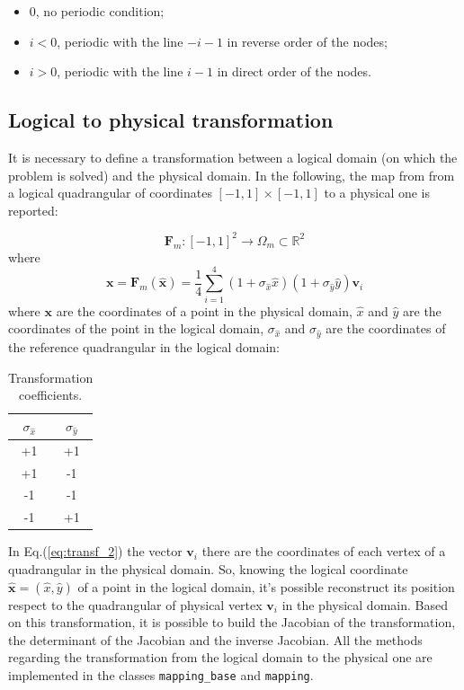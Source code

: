 \begin{itemize}
\item 0, no periodic condition;
\item $i<0$, periodic with the line $-i-1$ in reverse order of the nodes;
\item $i>0$, periodic with the line $i-1$ in direct order of the nodes.
\end{itemize}

\subsection{Logical to physical transformation}\label{subsec:mapping}
It is necessary to define a transformation between a logical domain (on which the problem is solved) and the physical domain. In the following, the map from from a logical quadrangular of coordinates $[-1,1]\times[-1,1]$ to a physical one is reported:

\begin{equation}\label{eq:transf_1}
\textbf{F}_m:[-1,1]^2 \rightarrow \Omega_m \subset \mathbb{R}^2
\end{equation}
where
\begin{equation}\label{eq:transf_2}
\textbf{x}=\textbf{F}_m(\hat{\textbf{x}})= \frac{1}{4} \sum_{i=1}^{4} (1+\sigma_{\hat{x}}\hat{x})(1+\sigma_{\hat{y}}\hat{y}) \textbf{v}_i
\end{equation}
where $\textbf{x}$ are the coordinates of a point in the physical domain, $\hat{x}$ and $\hat{y}$ are the coordinates of the point in the logical domain, $\sigma_{\hat{x}}$ and $\sigma_{\hat{y}}$ are the coordinates of the reference quadrangular in the logical domain:

\begin{table}
\centering
\begin{tabular}{|c|c|}
\hline
$\sigma_{\hat{x}}$ & $\sigma_{\hat{y}}$\\
\hline
+1 & +1\\
\hline
+1 & -1\\
\hline
-1 & -1\\
\hline
-1 & +1\\
\hline
\end{tabular}
\caption{Transformation coefficients.}
\label{tab:coeff}
\end{table}

In Eq.(\ref{eq:transf_2}) the vector $\textbf{v}_i$ there are the coordinates of each vertex of a quadrangular in the physical domain. So, knowing the logical coordinate $\hat{\textbf{x}}=(\hat{x},\hat{y})$ of a point in the logical domain, it's possible reconstruct its position respect to the quadrangular of physical vertex $\textbf{v}_i$ in the physical domain. Based on this transformation, it is possible to build the Jacobian of the transformation, the determinant of the Jacobian and the inverse Jacobian. All the methods regarding the transformation from the logical domain to the physical one are implemented in the classes \verb|mapping_base| and \verb|mapping|.

